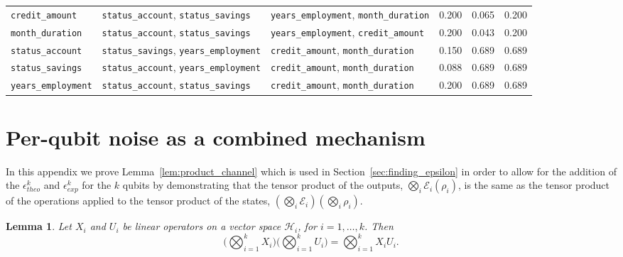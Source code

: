 \documentclass{ieeeaccess}
\newtheorem{lemma}{Lemma}[section]
\begin{document}
\begin{table}[htbp]
\begin{tabular}{@{}lllrrr@{}}
  \texttt{credit\_amount} & \texttt{status\_account}, \texttt{status\_savings} & \texttt{years\_employment}, \texttt{month\_duration} & 0.200 & 0.065 & 0.200 \\
  \texttt{month\_duration} & \texttt{status\_account}, \texttt{status\_savings} & \texttt{years\_employment}, \texttt{credit\_amount} & 0.200 & 0.043 & 0.200 \\
  \texttt{status\_account} & \texttt{status\_savings}, \texttt{years\_employment} & \texttt{credit\_amount}, \texttt{month\_duration} & 0.150 & 0.689 & 0.689 \\
  \texttt{status\_savings} & \texttt{status\_account}, \texttt{years\_employment} & \texttt{credit\_amount}, \texttt{month\_duration} & 0.088 & 0.689 & 0.689 \\
  \texttt{years\_employment} & \texttt{status\_account}, \texttt{status\_savings} & \texttt{credit\_amount}, \texttt{month\_duration} & 0.200 & 0.689 & 0.689 \\
  \bottomrule
  \end{tabular}
\end{table}

\section{Per-qubit noise as a combined mechanism}
\label{ap:composition_proof}

In this appendix we prove Lemma~\ref{lem:product_channel} which is used in Section~\ref{sec:finding_epsilon} in order to allow for the addition of the $\epsilon_{theo}^{k}$ and $\epsilon_{exp}^{k}$ for the $k$ qubits by demonstrating that the tensor product of the outputs, $\bigotimes_i\mathcal{E}_i(\rho_i)$, is the same as the tensor product of the operations applied to the tensor product of the states, $(\bigotimes_{i}\mathcal{E}_i)(\bigotimes_{i}\rho_i)$.

\begin{lemma}
  Let $X_i$ and $U_i$ be linear operators on a vector space $\mathcal{H}_i$, for $i = 1, \dots, k$. Then
  \[
    \Big(\bigotimes_{i=1}^{k} X_i\Big)\Big(\bigotimes_{i=1}^{k} U_i\Big) = \bigotimes_{i=1}^{k} X_i U_i.
  \]
  \label{lem:mixed_product}
\end{lemma}
\end{document}
